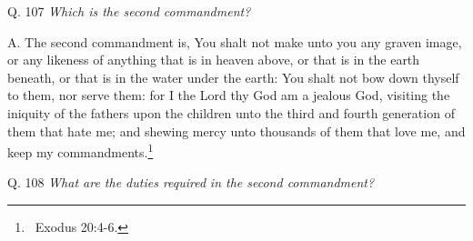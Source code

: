 {{{\bigskip

Q. 107 \textit{Which is the second commandment}\textit{?}

A. The second commandment is, You shalt not make unto you any graven image,
or any likeness of
anything that is in heaven above, or that is in the earth beneath, or that is in the water under the earth: You shalt not bow down thyself to them, nor serve them: for I the Lord thy God am a jealous God, visiting the iniquity of the fathers upon
the children unto the third and fourth generation of them that
hate me; and shewing mercy unto thousands of
them that love me, and keep my commandments.\footnote{\ Exodus 20:4-6.}


\bigskip

Q. 108 \textit{What are the duties required}\textit{ in the
second commandment}\textit{?}

}}}
